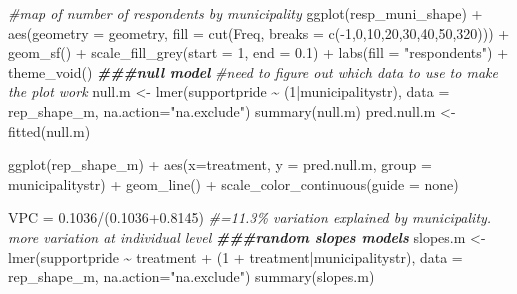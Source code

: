 \documentclass[
]{article}
\newenvironment{Shaded}{\begin{snugshade}}{\end{snugshade}}
\newcommand{\AttributeTok}[1]{\textcolor[rgb]{0.77,0.63,0.00}{#1}}
\newcommand{\CommentTok}[1]{\textcolor[rgb]{0.56,0.35,0.01}{\textit{#1}}}
\newcommand{\DecValTok}[1]{\textcolor[rgb]{0.00,0.00,0.81}{#1}}
\newcommand{\DocumentationTok}[1]{\textcolor[rgb]{0.56,0.35,0.01}{\textbf{\textit{#1}}}}
\newcommand{\FloatTok}[1]{\textcolor[rgb]{0.00,0.00,0.81}{#1}}
\newcommand{\FunctionTok}[1]{\textcolor[rgb]{0.00,0.00,0.00}{#1}}
\newcommand{\NormalTok}[1]{#1}
\newcommand{\OtherTok}[1]{\textcolor[rgb]{0.56,0.35,0.01}{#1}}
\newcommand{\SpecialCharTok}[1]{\textcolor[rgb]{0.00,0.00,0.00}{#1}}
\newcommand{\StringTok}[1]{\textcolor[rgb]{0.31,0.60,0.02}{#1}}
\begin{document}
\begin{Shaded}
\begin{Highlighting}[]
\CommentTok{\#map of number of respondents by municipality}
\FunctionTok{ggplot}\NormalTok{(resp\_muni\_shape) }\SpecialCharTok{+}
  \FunctionTok{aes}\NormalTok{(}\AttributeTok{geometry =}\NormalTok{ geometry, }\AttributeTok{fill =} \FunctionTok{cut}\NormalTok{(Freq,}
                                      \AttributeTok{breaks =} \FunctionTok{c}\NormalTok{(}\SpecialCharTok{{-}}\DecValTok{1}\NormalTok{,}\DecValTok{0}\NormalTok{,}\DecValTok{10}\NormalTok{,}\DecValTok{20}\NormalTok{,}\DecValTok{30}\NormalTok{,}\DecValTok{40}\NormalTok{,}\DecValTok{50}\NormalTok{,}\DecValTok{320}\NormalTok{))) }\SpecialCharTok{+}
  \FunctionTok{geom\_sf}\NormalTok{() }\SpecialCharTok{+}
  \FunctionTok{scale\_fill\_grey}\NormalTok{(}\AttributeTok{start =} \DecValTok{1}\NormalTok{, }\AttributeTok{end =} \FloatTok{0.1}\NormalTok{) }\SpecialCharTok{+}
  \FunctionTok{labs}\NormalTok{(}\AttributeTok{fill =} \StringTok{"respondents"}\NormalTok{) }\SpecialCharTok{+} \FunctionTok{theme\_void}\NormalTok{()}
\DocumentationTok{\#\#\#null model}
\CommentTok{\#need to figure out which data to use to make the plot work}
\NormalTok{null.m }\OtherTok{\textless{}{-}} \FunctionTok{lmer}\NormalTok{(supportpride }\SpecialCharTok{\textasciitilde{}}\NormalTok{ (}\DecValTok{1}\SpecialCharTok{|}\NormalTok{municipalitystr), }\AttributeTok{data =}\NormalTok{ rep\_shape\_m, }\AttributeTok{na.action=}\StringTok{"na.exclude"}\NormalTok{)}
\FunctionTok{summary}\NormalTok{(null.m)}
\NormalTok{pred.null.m }\OtherTok{\textless{}{-}} \FunctionTok{fitted}\NormalTok{(null.m)}

\FunctionTok{ggplot}\NormalTok{(rep\_shape\_m) }\SpecialCharTok{+}
  \FunctionTok{aes}\NormalTok{(}\AttributeTok{x=}\NormalTok{treatment, }\AttributeTok{y =}\NormalTok{ pred.null.m, }\AttributeTok{group =}\NormalTok{ municipalitystr) }\SpecialCharTok{+}
  \FunctionTok{geom\_line}\NormalTok{() }\SpecialCharTok{+}
  \FunctionTok{scale\_color\_continuous}\NormalTok{(}\AttributeTok{guide =} \StringTok{\textquotesingle{}none\textquotesingle{}}\NormalTok{) }

\NormalTok{VPC }\OtherTok{=} \FloatTok{0.1036}\SpecialCharTok{/}\NormalTok{(}\FloatTok{0.1036+0.8145}\NormalTok{)}
\CommentTok{\#=11.3\% variation explained by municipality. more variation at individual level}
\DocumentationTok{\#\#\#random slopes models}
\NormalTok{slopes.m }\OtherTok{\textless{}{-}} \FunctionTok{lmer}\NormalTok{(supportpride }\SpecialCharTok{\textasciitilde{}}\NormalTok{ treatment }\SpecialCharTok{+}\NormalTok{ (}\DecValTok{1} \SpecialCharTok{+}\NormalTok{ treatment}\SpecialCharTok{|}\NormalTok{municipalitystr), }\AttributeTok{data =}\NormalTok{ rep\_shape\_m, }\AttributeTok{na.action=}\StringTok{"na.exclude"}\NormalTok{)}
\FunctionTok{summary}\NormalTok{(slopes.m)}


\end{Highlighting}
\end{Shaded}
\end{document}
